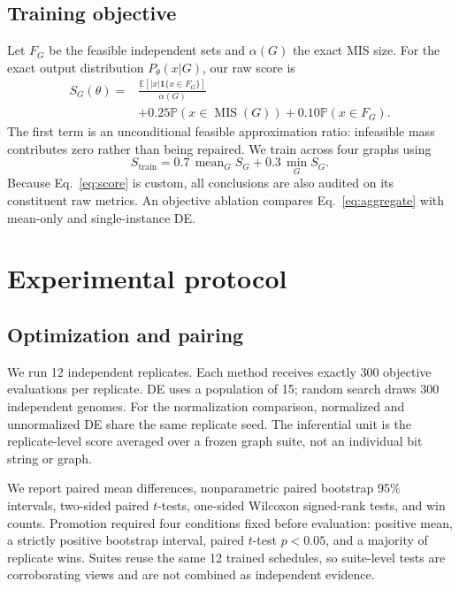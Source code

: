 \documentclass[10pt,twocolumn]{article}
\newcommand{\E}{\mathbb{E}}
\newcommand{\Prob}{\mathbb{P}}
\begin{document}
\subsection{Training objective}

Let $F_G$ be the feasible independent sets and $\alpha(G)$ the exact MIS size. For the exact output distribution $P_\theta(x|G)$, our raw score is
\begin{equation}
 \begin{aligned}
 S_G(\theta)={}&
 \frac{\E[|x|\mathbf{1}\{x\in F_G\}]}{\alpha(G)}\\
 &+0.25\Prob(x\in \operatorname{MIS}(G))
 +0.10\Prob(x\in F_G).
 \end{aligned}
 \label{eq:score}
\end{equation}
The first term is an unconditional feasible approximation ratio: infeasible mass contributes zero rather than being repaired. We train across four graphs using
\begin{equation}
 S_{\mathrm{train}}=0.7\,\operatorname{mean}_G S_G+0.3\,\min_G S_G.
 \label{eq:aggregate}
\end{equation}
Because Eq.~\eqref{eq:score} is custom, all conclusions are also audited on its constituent raw metrics. An objective ablation compares Eq.~\eqref{eq:aggregate} with mean-only and single-instance DE.

\section{Experimental protocol}

\subsection{Optimization and pairing}

We run 12 independent replicates. Each method receives exactly 300 objective evaluations per replicate. DE uses a population of 15; random search draws 300 independent genomes. For the normalization comparison, normalized and unnormalized DE share the same replicate seed. The inferential unit is the replicate-level score averaged over a frozen graph suite, not an individual bit string or graph.

We report paired mean differences, nonparametric paired bootstrap 95\% intervals, two-sided paired $t$-tests, one-sided Wilcoxon signed-rank tests, and win counts. Promotion required four conditions fixed before evaluation: positive mean, a strictly positive bootstrap interval, paired $t$-test $p<0.05$, and a majority of replicate wins. Suites reuse the same 12 trained schedules, so suite-level tests are corroborating views and are not combined as independent evidence.
\end{document}
